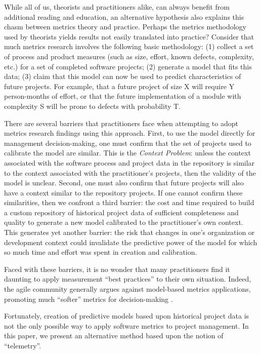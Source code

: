\documentclass[11pt,twocolumn]{article}
\begin{document}
While all of us, theorists and practitioners alike, can always benefit from
additional reading and education, an alternative hypothesis also explains
this chasm between metrics theory and practice. Perhaps the metrics
methodology used by theorists yields results not easily translated into
practice?  Consider that much metrics research involves the following basic
methodology: (1) collect a set of process and product measures (such as
size, effort, known defects, complexity, etc.) for a set of completed
software projects; (2) generate a model that fits this data; (3) claim that
this model can now be used to predict characteristics of future
projects. For example, that a future project of size X will require Y
person-months of effort, or that the future implementation of a module with
complexity S will be prone to defects with probability T.

There are several barriers that practitioners face when attempting to adopt
metrics research findings using this approach. First, to use the model
directly for management decision-making, one must confirm that the set of
projects used to calibrate the model are similar. This is the {\em Context
Problem}: unless the context associated with the software process and
project data in the repository is similar to the context associated with
the practitioner's projects, then the validity of the model is unclear.
Second, one must also confirm that future projects will also have a context
similar to the repository projects.  If one cannot confirm these
similarities, then we confront a third barrier: the cost and time required
to build a custom repository of historical project data of sufficient
completeness and quality to generate a new model calibrated to the
practitioner's own context. This generates yet another barrier: the risk
that changes in one's organization or development context could invalidate
the predictive power of the model for which so much time and effort was
spent in creation and calibration.

Faced with these barriers, it is no wonder that many practitioners find it
daunting to apply measurement ``best practices'' to their own
situation. Indeed, the agile community generally argues against model-based
metrics applications, promoting much ``softer'' metrics for decision-making
\cite{agile}.

Fortunately, creation of predictive models based upon historical project
data is not the only possible way to apply software metrics to project
management.  In this paper, we present an alternative method
based upon the notion of ``telemetry''.
\end{document}
